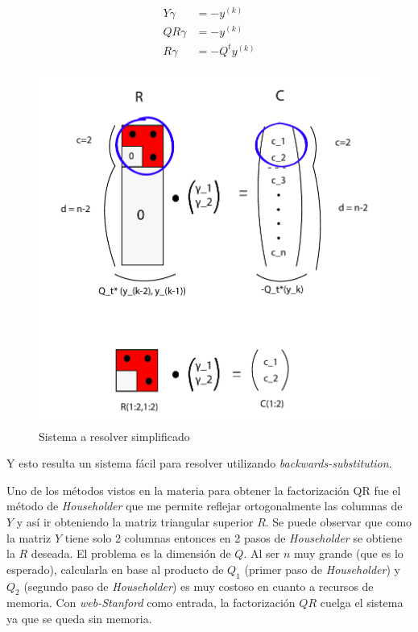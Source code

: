 \begin{align*}
	Y\gamma &=-y^{(k)}\\
	QR\gamma &=-y^{(k)}\\
	R\gamma &=-Q^{t}y^{(k)}\\
\end{align*}

\begin{figure}[!h]
	\begin{center}
		  \includegraphics[scale = 0.5]{graficos/im_1.pdf}
		  \caption{Sistema a resolver simplificado}
		  \label{fig:contra1}
	\end{center}
\end{figure}
\FloatBarrier
Y esto resulta un sistema f\'acil para resolver utilizando \emph{backwards-substitution}.

Uno de los m\'etodos vistos en la materia para obtener la factorizaci\'on QR fue el m\'etodo de \emph{Householder} \cite{Burden} que me permite reflejar ortogonalmente las columnas de $Y$ y as\'i ir obteniendo la matriz triangular superior $R$. Se puede observar que como la matriz $Y$ tiene solo 2 columnas entonces en 2 pasos de \emph{Householder} se obtiene la $R$ deseada. El problema es la dimensi\'on de $Q$. Al ser $n$ muy grande (que es lo esperado), calcularla en base al producto de $Q_1$ (primer paso de \emph{Householder}) y $Q_2$ (segundo paso de \emph{Householder}) es muy costoso en cuanto a recursos de memoria. Con \emph{web-Stanford} como entrada, la factorizaci\'on $QR$ cuelga el sistema ya que se queda sin memoria. 

